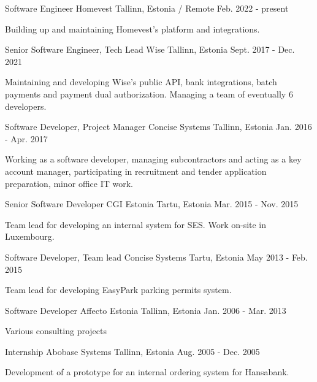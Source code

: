 \begin{cventries}
  \cventry
      {Software Engineer}
      {Homevest}
      {Tallinn, Estonia / Remote}
      {Feb. 2022 - present}
      {
        \begin{cvitems}
          \item {Building up and maintaining Homevest's platform and integrations.}
        \end{cvitems}
      }
  \cventry
      {Senior Software Engineer, Tech Lead}
      {Wise}
      {Tallinn, Estonia}
      {Sept. 2017 - Dec. 2021}
      {
        \begin{cvitems}
          \item {Maintaining and developing Wise's public API, bank integrations, batch payments and payment dual authorization. Managing a team of eventually 6 developers.}
        \end{cvitems}
      }
  \cventry
    {Software Developer, Project Manager}
    {Concise Systems}
    {Tallinn, Estonia}
    {Jan. 2016 - Apr. 2017}
    {
      \begin{cvitems}
        \item {Working as a software developer, managing subcontractors and acting as a key account manager, participating in recruitment and tender application preparation, minor office IT work.}
      \end{cvitems}
    }
  \cventry
    {Senior Software Developer}
    {CGI Estonia}
    {Tartu, Estonia}
    {Mar. 2015 - Nov. 2015}
    {
      \begin{cvitems}
        \item {Team lead for developing an internal system for SES. Work on-site in Luxembourg.}
      \end{cvitems}
    }
  \cventry
    {Software Developer, Team lead}
    {Concise Systems}
    {Tartu, Estonia}
    {May 2013 - Feb. 2015}
    {
      \begin{cvitems}
        \item {Team lead for developing EasyPark parking permits system.}
      \end{cvitems}
    }
  \cventry
    {Software Developer}
    {Affecto Estonia}
    {Tallinn, Estonia}
    {Jan. 2006 - Mar. 2013}
    {
      \begin{cvitems}
        \item {Various consulting projects}
      \end{cvitems}
    }
  \cventry
    {Internship}
    {Abobase Systems}
    {Tallinn, Estonia}
    {Aug. 2005 - Dec. 2005}
    {
      \begin{cvitems}
        \item {Development of a prototype for an internal ordering system for Hansabank.}
      \end{cvitems}
    }
\end{cventries}
